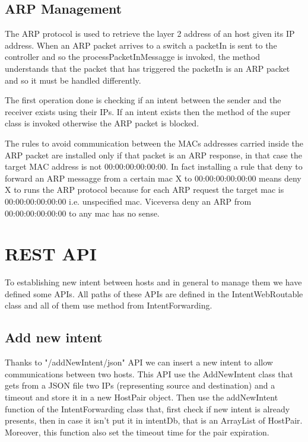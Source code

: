 \documentclass[a4paper]{report}
\begin{document}
\subsection{ARP Management}
\noindent The ARP protocol is used to retrieve the layer 2 address of an host given its IP address. When an ARP packet arrives to a switch a packetIn is sent to the controller and so the processPacketInMessagge is invoked, the method understands that the packet that has triggered the packetIn is an ARP packet and so it must be handled differently.


\noindent The first operation done is checking if an intent between the sender and the receiver exists using their IPs. If an intent exists then the method of the super class is invoked otherwise the ARP packet is blocked.


\noindent The rules to avoid communication between the MACs addresses carried inside the ARP packet are installed only if that packet is an ARP response, in that case the target MAC address is not 00:00:00:00:00:00. In fact installing a rule that deny to forward an ARP messagge from a certain mac X to 00:00:00:00:00:00 means deny X to runs the ARP protocol because for each ARP request the target mac is 00:00:00:00:00:00 i.e. unspecified mac. Viceversa deny an ARP from 00:00:00:00:00:00 to any mac has no sense.	
	
	\section{REST API}
	\noindent To establishing new intent between hosts and in general to manage them we have defined some APIs. All paths of these APIs are defined in the IntentWebRoutable class and all of them use method from IntentForwarding.
	
	\subsection{Add new intent}
	\noindent Thanks to "/addNewIntent/json" API we can insert a new intent to allow communications between two hosts. This API use the AddNewIntent class that gets from a JSON file two IPs (representing source and destination) and a timeout and store it in a new HostPair object. Then use the addNewIntent function of the IntentForwarding class that, first check if new intent is already presents, then in case it isn’t put it in intentDb, that is an ArrayList of HostPair. Moreover, this function also set the timeout time for the pair expiration.
	
\end{document}
